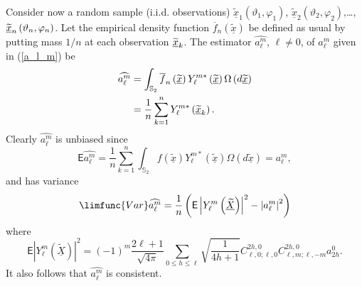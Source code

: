 \documentclass[preprint,11pt,a4paper]{elsarticle}
\begin{document}
Consider now a random sample (i.i.d. observations) $\underline{\widetilde{x}}%
_{1}\left( \vartheta_{1},\varphi_{1}\right) $, $\underline{\widetilde{x}}%
_{2}\left( \vartheta_{2},\varphi_{2}\right) $,\ldots ,$\underline{\widetilde{%
x}}_{n}\left( \vartheta_{n},\varphi_{n}\right) $. Let the empirical density
function $\overline{f}_{n}\left( \underline{\widetilde{x}}\right) $ be
defined as usual by putting mass $1/n$ at each observation $\underline{%
\widetilde{x}}_{k}$. The estimator $\widehat{a_{\ell}^{m}}$, $\ell\neq0$, of 
$a_{\ell}^{m}$ given in (\ref{a_l_m}) be 
\begin{align}
\widehat{a_{\ell}^{m}} & =\int_{\mathbb{S}_{2}}\overline{f}_{n}\left( 
\underline{\widetilde{x}}\right) Y_{\ell}^{m\ast}\left( \underline{%
\widetilde{x}}\right) \Omega\left( d\underline{\widetilde{x}}\right)  \notag
\\
& =\frac{1}{n}\sum_{k=1}^{n}Y_{\ell}^{m\ast}\left( \underline{\widetilde{x}}%
_{k}\right) .  \label{Esti_a_l_m}
\end{align}
Clearly $\widehat{a_{\ell}^{m}}$ is unbiased since 
\begin{equation*}
\mathsf{E}\widehat{a_{\ell}^{m}}=\frac{1}{n}\sum_{k=1}^{n}\int_{\mathbb{S}%
_{2}}f\left( \underline{\widetilde{x}}\right) Y_{\ell}^{m\ast}\left( 
\underline{\widetilde{x}}\right) \Omega\left( d\underline{\widetilde{x}}%
\right) =a_{\ell}^{m},
\end{equation*}
and has variance%
\begin{equation*}
\limfunc{Var}\widehat{a_{\ell}^{m}}=\frac{1}{n}\left( \mathsf{E}\left\vert
Y_{\ell}^{m}\left( \underline{\widetilde{X}}\right) \right\vert
^{2}-\left\vert a_{\ell}^{m}\right\vert ^{2}\right)
\end{equation*}
where%
\begin{equation*}
\mathsf{E}\left\vert Y_{\ell}^{m}\left( \underline{\widetilde{X}}\right)
\right\vert ^{2}=\left( -1\right) ^{m}\frac{2\ell+1}{\sqrt{4\pi}}\sum_{0\leq
h\leq\ell}\sqrt{\frac{1}{4h+1}}C_{\ell,0;\ell,0}^{2h,0}C_{\ell,m;\ell
,-m}^{2h,0}a_{2h}^{0}.
\end{equation*}
It also follows that $\widehat{a_{\ell}^{m}}$ is consistent.
\end{document}
